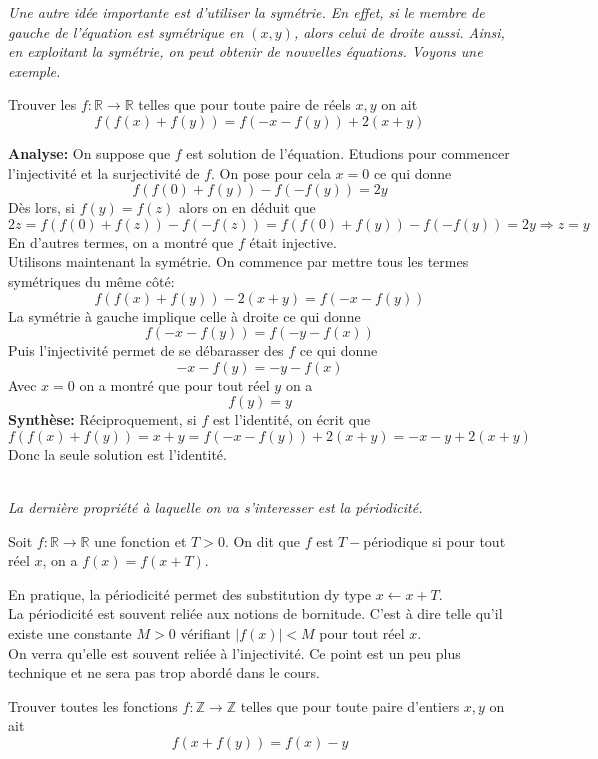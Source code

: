 \emph{Une autre idée importante est d'utiliser la symétrie. En effet, si le membre de gauche de l'équation est symétrique en $(x,y)$, alors celui de droite aussi. Ainsi, en exploitant la symétrie, on peut obtenir de nouvelles équations. Voyons une exemple.}
\begin{ex}
Trouver les $f:\mathbb{R}\to \mathbb{R}$ telles que pour toute paire de réels $x,y$ on ait
$$f(f(x)+f(y))=f(-x-f(y))+2(x+y) $$
\end{ex}

\begin{preuve}
\textbf{Analyse:} On suppose que $f$ est solution de l'équation. Etudions pour commencer l'injectivité et la surjectivité de $f$. On pose pour cela $x=0$ ce qui donne 
$$f(f(0)+f(y))-f(-f(y))=2y $$
Dès lors, si $f(y)=f(z)$ alors on en déduit que 
$$2z=f(f(0)+f(z))-f(-f(z))=f(f(0)+f(y))-f(-f(y))=2y\Rightarrow z=y $$
En d'autres termes, on a montré que $f$ était injective. 
\\
Utilisons maintenant la symétrie. On commence par mettre tous les termes symétriques du même côté:
$$ f(f(x)+f(y))-2(x+y)=f(-x-f(y))$$
La symétrie à gauche implique celle à droite ce qui donne 
$$f(-x-f(y))=f(-y-f(x)) $$
Puis l'injectivité permet de se débarasser des $f$ ce qui donne 
$$-x-f(y)=-y-f(x) $$
Avec $x=0$ on a montré que pour tout réel $y$ on a 
$$f(y)=y $$
\textbf{Synthèse:} Réciproquement, si $f$ est l'identité, on écrit que 
$$f(f(x)+f(y))=x+y=f(-x-f(y))+2(x+y)=-x-y+2(x+y) $$
Donc la seule solution est l'identité.
\end{preuve}
\\
\emph{La dernière propriété à laquelle on va s'interesser est la périodicité.}
\begin{dfn}[Périodicité]
Soit $f:\mathbb{R}\to \mathbb{R}$ une fonction et $T>0$. On dit que $f$ est $T-$périodique si pour tout réel $x$, on a $f(x)=f(x+T)$.

\end{dfn}
\begin{rem}
En pratique, la périodicité permet des substitution dy type $x\gets x+T$. 
\\
La périodicité est souvent reliée aux notions de bornitude. C'est à dire telle qu'il existe une constante $M>0$ vérifiant 
$|f(x)|<M$ pour tout réel $x$.
\\
On verra qu'elle est souvent reliée à l'injectivité. Ce point est un peu plus technique et ne sera pas trop abordé dans le cours.
\end{rem}
\begin{exo}[M]
Trouver toutes les fonctions $f:\mathbb{Z}\to \mathbb{Z}$ telles que pour toute paire d'entiers $x,y$ on ait
$$f(x+f(y))=f(x)-y $$

\end{exo}
